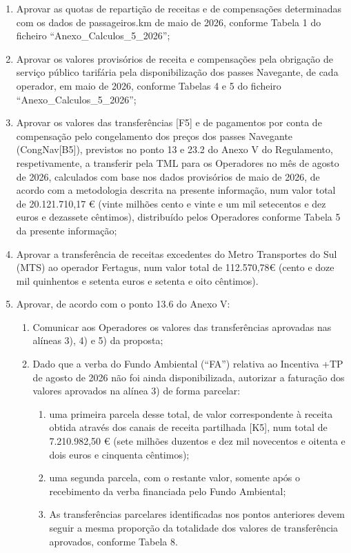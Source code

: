 \documentclass[
  a4paper,
]{article}
\providecommand{\tightlist}{%
  \setlength{\itemsep}{0pt}\setlength{\parskip}{0pt}}
\begin{document}
\begin{enumerate}
\def\labelenumi{\arabic{enumi})}
\item
  Aprovar as quotas de repartição de receitas e de compensações
  determinadas com os dados de passageiros.km de maio de 2026, conforme
  Tabela 1 do ficheiro ``Anexo\_Calculos\_5\_2026'';
\item
  Aprovar os valores provisórios de receita e compensações pela
  obrigação de serviço público tarifária pela disponibilização dos
  passes Navegante, de cada operador, em maio de 2026, conforme Tabelas
  4 e 5 do ficheiro ``Anexo\_Calculos\_5\_2026'';
\item
  Aprovar os valores das transferências {[}F5{]} e de pagamentos por
  conta de compensação pelo congelamento dos preços dos passes Navegante
  (CongNav{[}B5{]}), previstos no ponto 13 e 23.2 do Anexo V do
  Regulamento, respetivamente, a transferir pela TML para os Operadores
  no mês de agosto de 2026, calculados com base nos dados provisórios de
  maio de 2026, de acordo com a metodologia descrita na presente
  informação, num valor total de 20.121.710,17 € (vinte milhões cento e
  vinte e um mil setecentos e dez euros e dezassete cêntimos),
  distribuído pelos Operadores conforme Tabela 5 da presente informação;
\item
  Aprovar a transferência de receitas excedentes do Metro Transportes do
  Sul (MTS) ao operador Fertagus, num valor total de 112.570,78€ (cento
  e doze mil quinhentos e setenta euros e setenta e oito cêntimos).
\item
  Aprovar, de acordo com o ponto 13.6 do Anexo V:

  \begin{enumerate}
  \def\labelenumii{\alph{enumii}.}
  \tightlist
  \item
    Comunicar aos Operadores os valores das transferências aprovadas nas
    alíneas 3), 4) e 5) da proposta;
  \item
    Dado que a verba do Fundo Ambiental (``FA'') relativa ao Incentiva
    +TP de agosto de 2026 não foi ainda disponibilizada, autorizar a
    faturação dos valores aprovados na alínea 3) de forma parcelar:

    \begin{enumerate}
    \def\labelenumiii{\roman{enumiii}.}
    \tightlist
    \item
      uma primeira parcela desse total, de valor correspondente à
      receita obtida através dos canais de receita partilhada {[}K5{]},
      num total de 7.210.982,50 € (sete milhões duzentos e dez mil
      novecentos e oitenta e dois euros e cinquenta cêntimos);
    \item
      uma segunda parcela, com o restante valor, somente após o
      recebimento da verba financiada pelo Fundo Ambiental;
    \item
      As transferências parcelares identificadas nos pontos anteriores
      devem seguir a mesma proporção da totalidade dos valores de
      transferência aprovados, conforme Tabela 8.
    \end{enumerate}
  \end{enumerate}
\end{enumerate}
\end{document}
